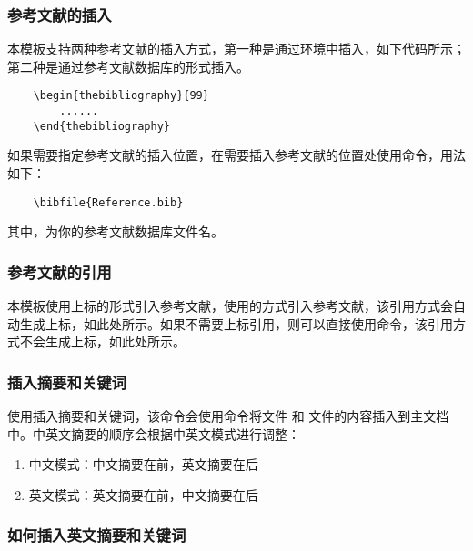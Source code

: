\documentclass{nitthesis}
\begin{document}
\subsubsection{参考文献的插入}

本模板支持两种参考文献的插入方式，第一种是通过环境中插入，如下代码所示；第二种是通过参考文献数据库的形式插入。

\begin{lstlisting}
    \begin{thebibliography}{99}
        ......
    \end{thebibliography}
\end{lstlisting}

如果需要指定参考文献的插入位置，在需要插入参考文献的位置处使用命令，用法如下：

\begin{lstlisting}
    \bibfile{Reference.bib}
\end{lstlisting}

其中，为你的参考文献数据库文件名。

\subsubsection{参考文献的引用}

本模板使用上标的形式引入参考文献，使用的方式引入参考文献，该引用方式会自动生成上标，如此处所示。如果不需要上标引用，则可以直接使用命令，该引用方式不会生成上标，如此处\cite{全权2020低空无人机交通管理概览与建议}所示。

\subsubsection{插入摘要和关键词}

使用插入摘要和关键词，该命令会使用命令将文件  和  文件的内容插入到主文档中。中英文摘要的顺序会根据中英文模式进行调整：

\begin{enumerate}
    \item 中文模式：中文摘要在前，英文摘要在后
    \item 英文模式：英文摘要在前，中文摘要在后
\end{enumerate}

\subsubsection{如何插入英文摘要和关键词}
\end{document}
